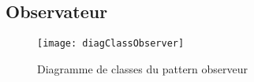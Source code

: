 \subsection{Observateur}
\begin{figure}[h]
\begin{center}
    \texttt{[image: diagClassObserver]}
\end{center}
    \caption{Diagramme de classes du pattern observeur}
    \label{classes-oberveur}
\end{figure}